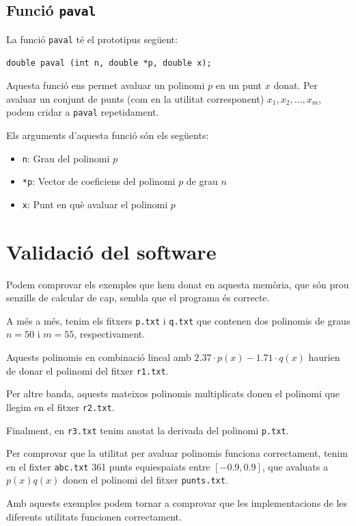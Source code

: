 \documentclass[12pt,twoside,a4paper]{article}
\newcommand{\fn}[2]{\begin{tcolorbox}[enhanced,colback=white,colframe=gray!50!white,attach boxed title to top center={yshift=-3mm,yshifttext=-1mm},title={Funció \texttt{#1}},boxed title style={size=small,colframe=black},colbacktitle=white,coltitle=black]\texttt{#2}\end{tcolorbox}}
\begin{document}
\subsection{Funció \texttt{paval}}
La funció \texttt{paval} té el prototipus següent:

\fn{paval}{double paval (int n, double *p, double x);}

Aquesta funció ens permet avaluar un polinomi $p$ en un punt $x$ donat. Per avaluar un conjunt de punts (com en la utilitat corresponent) $x_1, x_2, \ldots, x_m$, podem cridar a \texttt{paval} repetidament.

Els arguments d'aquesta funció són els següents:
\begin{itemize}
    \item \texttt{n}: Grau del polinomi $p$
    \item \texttt{*p}: Vector de coeficiens del polinomi $p$ de grau $n$
    \item \texttt{x}: Punt en què avaluar el polinomi $p$
\end{itemize}

\newpage

\section{Validació del software}
Podem comprovar els exemples que hem donat en aquesta memòria, que són prou senzills de calcular de cap, sembla que el programa és correcte.

A més a més, tenim els fitxers \texttt{p.txt} i \texttt{q.txt} que contenen dos polinomis de graus $n = 50$ i $m = 55$, respectivament.

Aquests polinomis en combinació lineal amb $2.37 \cdot p(x) - 1.71 \cdot q(x)$ haurien de donar el polinomi del fitxer \texttt{r1.txt}.

Per altre banda, aquests mateixos polinomis multiplicats donen el polinomi que llegim en el fitxer \texttt{r2.txt}.

Finalment, en \texttt{r3.txt} tenim anotat la derivada del polinomi \texttt{p.txt}.

Per comprovar que la utilitat per avaluar polinomis funciona correctament, tenim en el fixter \texttt{abc.txt} 361 punts equiespaiats entre $[-0.9, 0.9]$, que avaluats a $p(x)q(x)$ donen el polinomi del fitxer \texttt{punts.txt}.

Amb aquests exemples podem tornar a comprovar que les implementacions de les diferents utilitats funcionen correctament.
\end{document}

